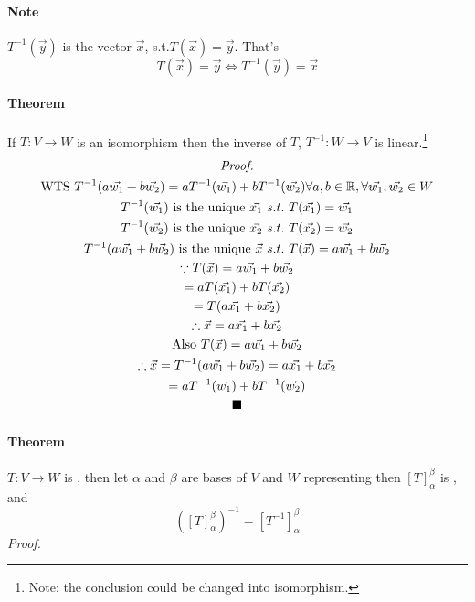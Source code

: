 \documentclass[11pt]{article}
\newcommand{\trans}[3]{{#1}: {#2} \to {#3}}
\newcommand{\R}[0]{\mathbb{R}}
\newcommand{\tmat}[3]{[{#1}]_{{#2}}^{{#3}}}
\newcommand{\theorem}[0]{\paragraph{Theorem}}
\begin{document}
	\paragraph{Note} $T^{-1}(\vec{y})$ is the  vector $\vec{x}$, s.t.$T(\vec{x}) = \vec{y}$. That's
	\[
		T(\vec{x}) = \vec{y} \iff T^{-1}(\vec{y}) = \vec{x}
	\]
	\theorem If $\trans{T}{V}{W}$ is an isomorphism then the inverse of $T$, $\trans{T^{-1}}{W}{V}$ is linear.\footnote{Note: the conclusion could be changed into isomorphism.}
	\begin{multline*}
		\emph{Proof.} \\
		\text{WTS } T^{-1}(a\vec{w_1} + b\vec{w_2}) = aT^{-1}(\vec{w_1}) + bT^{-1}(\vec{w_2}) \forall a,b \in \R, \forall \vec{w_1}, \vec{w_2} \in W \\
		T^{-1}(\vec{w_1}) \text{ is the unique }\vec{x_1}\ s.t.\ T(\vec{x_1}) = \vec{w_1} \\
		T^{-1}(\vec{w_2}) \text{ is the unique }\vec{x_2}\ s.t.\ T(\vec{x_2}) = \vec{w_2} \\
		T^{-1}(a\vec{w_1} + b\vec{w_2}) \text{ is the unique } \vec{x}\ s.t.\ T(\vec{x}) = a\vec{w_1} + b\vec{w_2} \\
		\because T(\vec{x}) = a\vec{w_1} + b\vec{w_2} \\
		= aT(\vec{x_1}) + bT(\vec{x_2}) \\
		= T(a\vec{x_1} + b\vec{x_2}) \\
		\therefore \vec{x} = a\vec{x_1} + b\vec{x_2} \\
		\text{Also } T(\vec{x}) = a\vec{w_1} + b\vec{w_2} \\
		\therefore \vec{x} = T^{-1}(a \vec{w_1} + b \vec{w_2}) = a\vec{x_1} + b\vec{x_2} \\
		= aT^{-1}(\vec{w_1}) + b T^{-1}(\vec{w_2}) \\
		\blacksquare
	\end{multline*}
	\theorem $\trans{T}{V}{W}$ is , then let $\alpha$ and $\beta$ are bases of $V$ and $W$ representing then $\tmat{T}{\alpha}{\beta}$ is , and 
	\[
		(\tmat{T}{\alpha}{\beta})^{-1} = \tmat{T^{-1}}{\alpha}{\beta}
	\]
	\newline \emph{Proof.}
	\newline {}
	
\end{document}

